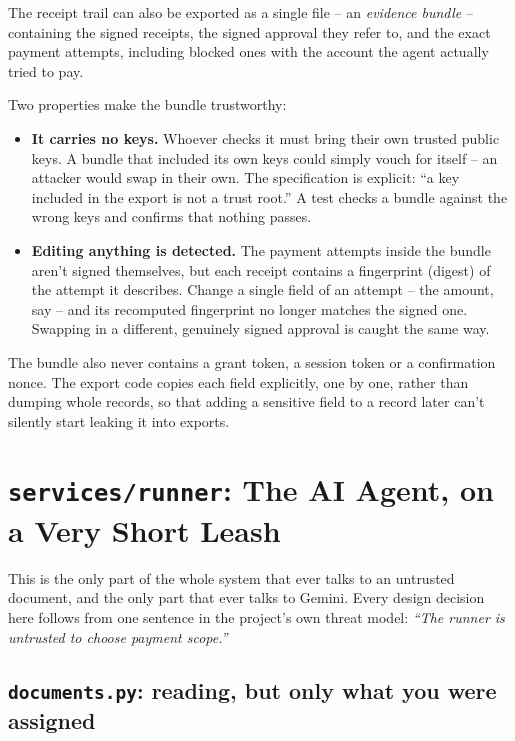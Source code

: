 \documentclass[11pt]{report}
\newcommand{\file}[1]{\texttt{#1}}
\begin{document}
The receipt trail can also be exported as a single file -- an
\emph{evidence bundle} -- containing the signed receipts, the signed
approval they refer to, and the exact payment attempts, including blocked
ones with the account the agent actually tried to pay.

Two properties make the bundle trustworthy:

\begin{itemize}[leftmargin=2em]
\item \textbf{It carries no keys.} Whoever checks it must bring their own
  trusted public keys. A bundle that included its own keys could simply
  vouch for itself -- an attacker would swap in their own. The
  specification is explicit: ``a key included in the export is not a trust
  root.'' A test checks a bundle against the wrong keys and confirms that
  nothing passes.
\item \textbf{Editing anything is detected.} The payment attempts inside
  the bundle aren't signed themselves, but each receipt contains a
  fingerprint (digest) of the attempt it describes. Change a single field
  of an attempt -- the amount, say -- and its recomputed fingerprint no
  longer matches the signed one. Swapping in a different, genuinely signed
  approval is caught the same way.
\end{itemize}

The bundle also never contains a grant token, a session token or a
confirmation nonce. The export code copies each field explicitly, one by
one, rather than dumping whole records, so that adding a sensitive field
to a record later can't silently start leaking it into exports.

\chapter{\file{services/runner}: The AI Agent, on a Very Short Leash}
\label{ch:runner}

This is the only part of the whole system that ever talks to an
untrusted document, and the only part that ever talks to Gemini. Every
design decision here follows from one sentence in the project's own
threat model: \emph{``The runner is untrusted to choose payment
scope.''}

\section{\file{documents.py}: reading, but only what you were assigned}
\end{document}
